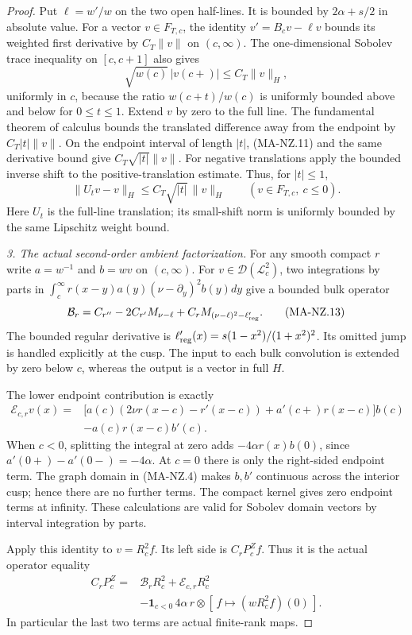 \begin{proof}
Put $\ell=w'/w$ on the two open half-lines.  It is bounded
by $2\alpha+s/2$ in absolute value.
For a vector $v\in F_{T,c}$, the identity
$v'=B_cv-\ell v$ bounds its weighted first derivative
by $C_T\|v\|$ on $(c,\infty)$.
The one-dimensional Sobolev trace inequality on $[c,c+1]$
also gives
\[
             \sqrt{w(c)}\,|v(c+)|\le C_T\|v\|_H,
 \tag{MA-NZ.11}
\]
uniformly in $c$, because the ratio $w(c+t)/w(c)$
is uniformly bounded above and below for $0\le t\le1$.
Extend $v$ by zero to the full line.
The fundamental theorem of calculus bounds the translated
difference away from the endpoint by $C_T|t|\|v\|$.
On the endpoint interval of length $|t|$, (MA-NZ.11)
and the same derivative bound give $C_T\sqrt{|t|}\|v\|$.
For negative translations apply the bounded inverse shift
to the positive-translation estimate.
Thus, for $|t|\le1$,
\[
      \|U_tv-v\|_H\le C_T\sqrt{|t|}\,\|v\|_H
                      \qquad(v\in F_{T,c},\ c\le0).
 \tag{MA-NZ.12}
\]
Here $U_t$ is the full-line translation; its small-shift
norm is uniformly bounded by the same Lipschitz weight bound.

\emph{3. The actual second-order ambient factorization.}
For any smooth compact $r$ write
$a=w^{-1}$ and $b=wv$ on $(c,\infty)$.
For $v\in\mathcal D(\mathcal L_c^2)$, two integrations
by parts in
$\int_c^\infty r(x-y)a(y)(\nu-\partial_y)^2b(y)dy$
give a bounded bulk operator
\[
 \mathcal B_r
   =C_{r''}-2C_{r'}M_{\nu-\ell}
          +C_rM_{(\nu-\ell)^2-\ell'_{\rm reg}}.
 \tag{MA-NZ.13}
\]
The bounded regular derivative is
$\ell'_{\rm reg}(x)=s(1-x^2)/(1+x^2)^2$.
Its omitted jump is handled explicitly at the cusp.
The input to each bulk convolution is extended by zero
below $c$, whereas the output is a vector in full $H$.

The lower endpoint contribution is exactly
\[
 \begin{split}
 \mathcal E_{c,r}v(x)
  ={}&\bigl[a(c)(2\nu r(x-c)-r'(x-c))
                        +a'(c+)r(x-c)\bigr]b(c)\\
     &-a(c)r(x-c)b'(c).
 \end{split}
 \tag{MA-NZ.14}
\]
When $c<0$, splitting the integral at zero adds
$-4\alpha r(x)b(0)$, since $a'(0+)-a'(0-)=-4\alpha$.
At $c=0$ there is only the right-sided endpoint term.
The graph domain in (MA-NZ.4) makes $b,b'$ continuous
across the interior cusp; hence there are no further
terms.  The compact kernel gives zero endpoint terms
at infinity.  These calculations are valid for Sobolev
domain vectors by interval integration by parts.

Apply this identity to $v=R_c^2f$.  Its left side is
$C_rP_c^Zf$.  Thus it is the actual operator equality
\[
 \begin{split}
 C_rP_c^Z={}&\mathcal B_rR_c^2+\mathcal E_{c,r}R_c^2\\
 &-\mathbf1_{c<0}\,4\alpha\,r\otimes
                              [\,f\mapsto(wR_c^2f)(0)\,].
 \end{split}
 \tag{MA-NZ.15}
\]
In particular the last two terms are actual finite-rank maps.


\end{proof}
